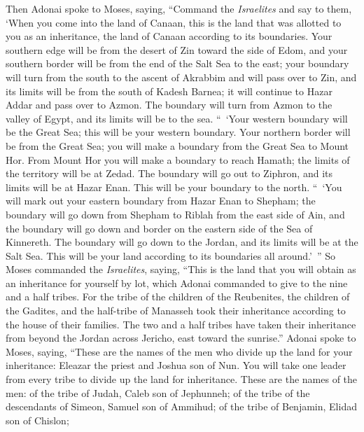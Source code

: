 \begin{biblechapter} %
 Then Adonai spoke to Moses, saying,
\verse “Command the \textit{Israelites} and say to them, ‘When you come into the land of Canaan, this is the land that was allotted to you as an inheritance, the land of Canaan according to its boundaries.
\verse Your southern edge will be from the desert of Zin toward the side of Edom, and your southern border will be from the end of the Salt Sea to the east;
\verse your boundary will turn from the south to the ascent of Akrabbim and will pass over to Zin, and its limits will be from the south of Kadesh Barnea; it will continue to Hazar Addar and pass over to Azmon.
\verse The boundary will turn from Azmon to the valley of Egypt, and its limits will be to the sea.
\verse “ ‘Your western boundary will be the Great Sea; this will be your western boundary.
\verse Your northern border will be from the Great Sea; you will make a boundary from the Great Sea to Mount Hor.
\verse From Mount Hor you will make a boundary to reach Hamath; the limits of the territory will be at Zedad.
\verse The boundary will go out to Ziphron, and its limits will be at Hazar Enan. This will be your boundary to the north.
\verse “ ‘You will mark out your eastern boundary from Hazar Enan to Shepham;
\verse the boundary will go down from Shepham to Riblah from the east side of Ain, and the boundary will go down and border on the eastern side of the Sea of Kinnereth.
\verse The boundary will go down to the Jordan, and its limits will be at the Salt Sea. This will be your land according to its boundaries all around.’ ”
\verse So Moses commanded the \textit{Israelites}, saying, “This is the land that you will obtain as an inheritance for yourself by lot, which Adonai commanded to give to the nine and a half tribes.
\verse For the tribe of the children of the Reubenites, the children of the Gadites, and the half-tribe of Manasseh took their inheritance according to the house of their families.
\verse The two and a half tribes have taken their inheritance from beyond the Jordan across Jericho, east toward the sunrise.”
\verse Adonai spoke to Moses, saying,
\verse “These are the names of the men who divide up the land for your inheritance: Eleazar the priest and Joshua son of Nun.
\verse You will take one leader from every tribe to divide up the land for inheritance.
\verse These are the names of the men: of the tribe of Judah, Caleb son of Jephunneh;
\verse of the tribe of the descendants of Simeon, Samuel son of Ammihud;
\verse of the tribe of Benjamin, Elidad son of Chislon;

\end{biblechapter}
